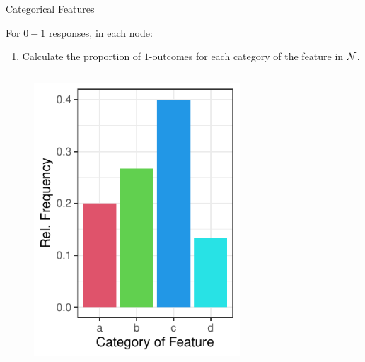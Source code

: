 \documentclass[11pt,compress,t,notes=noshow, xcolor=table]{beamer}
\begin{document}
  \begin{frame}{Categorical Features}

For $0-1$ responses, in each node:
  \begin{enumerate}
  \item Calculate the proportion of $1$-outcomes for each category of the feature in $\mathcal{N}$.

  \end{enumerate}
  \begin{columns}
  \begin{column}{0.33\textwidth}
  \begin{figure}
  \includegraphics[width=0.8\textwidth]{figure/categoryplot-binary1.pdf} 
  \end{figure}
  \end{column}
  \begin{column}{0.33\textwidth}
  \lz
  \end{column}
  \begin{column}{0.33\textwidth}
  \lz
  \end{column}
  \end{columns}

\end{frame}
\end{document}
